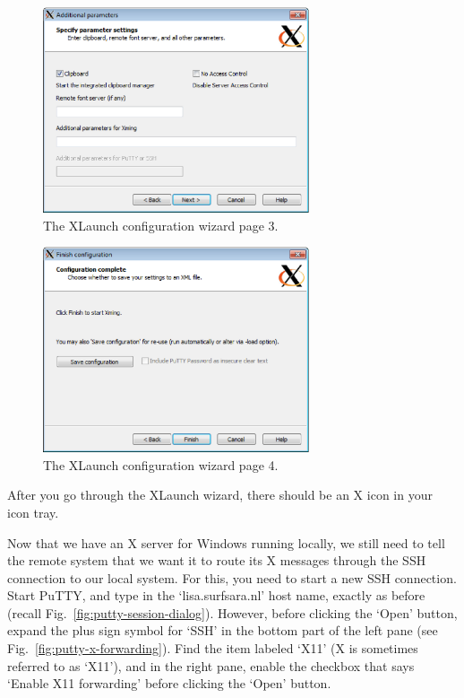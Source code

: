\begin{figure}[H]
  \centering
    \includegraphics[width=0.7\textwidth]{./../eps/xlaunch-4.eps}
  \caption{The XLaunch configuration wizard page 3.}
  \label{fig:xlaunch-3}
\end{figure}

\begin{figure}[H]
  \centering
    \includegraphics[width=0.7\textwidth]{./../eps/xlaunch-5.eps}
  \caption{The XLaunch configuration wizard page 4.}
  \label{fig:xlaunch-4}
\end{figure}



After you go through the XLaunch wizard, there should be an X icon in your icon tray.

Now that we have an X server for Windows running locally, we still need to tell the remote system that we want it to route its X messages through the SSH connection to our local system. For this, you need to start a new SSH connection. Start PuTTY, and type in the `lisa.surfsara.nl' host name, exactly as before (recall Fig.~\ref{fig:putty-session-dialog}). However, before clicking the `Open' button, expand the plus sign symbol for `SSH' in the bottom part of the left pane (see Fig.~\ref{fig:putty-x-forwarding}). Find the item labeled `X11' (X is sometimes referred to as `X11'), and in the right pane, enable the checkbox that says `Enable X11 forwarding' before clicking the `Open' button.

